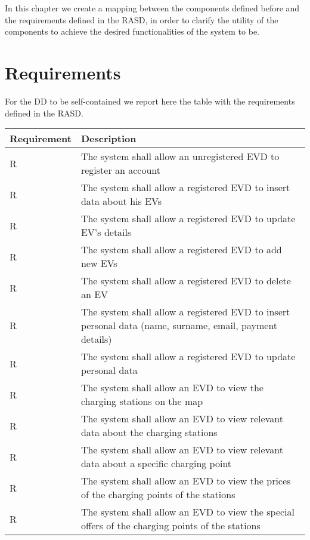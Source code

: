 In this chapter we create a mapping between the components defined before and the requirements defined in the RASD, in order to clarify the utility of the components to achieve the desired functionalities of the system to be. 
\section{Requirements}
For the DD to be self-contained we report here the table with the requirements defined in the RASD.  
\setcounter{r}{1}
\newcommand{\rcount}{\ther\stepcounter{r}}
\begin{center}
    \begin{longtable}[H]{|p{0.2\linewidth}|p{0.8\linewidth}|}
     \hline
     \textbf{Requirement} & \textbf{Description}\\
     \hline
     R\rcount & The system shall allow an unregistered EVD to register an account\\
     \hline
     R\rcount & The system shall allow a registered EVD to insert data about his EVs \\
     \hline
     R\rcount & The system shall allow a registered EVD to update EV's details\\
     \hline
     R\rcount & The system shall allow a registered EVD to add new EVs \\
     \hline
     R\rcount & The system shall allow a registered EVD to delete an EV\\
     \hline
     R\rcount & The system shall allow a registered EVD to insert personal data (name, surname, email, payment details)\\
     \hline
     R\rcount & The system shall allow a registered EVD to update personal data\\
     \hline
     R\rcount & The system shall allow an EVD to view the charging stations on the map\\
     \hline
     R\rcount & The system shall allow an EVD to view relevant data about the charging stations\\
     \hline
     R\rcount & The system shall allow an EVD to view relevant data about a specific charging point\\
     \hline
     R\rcount & The system shall allow an EVD to view the prices of the charging points of the stations\\
     \hline
     R\rcount & The system shall allow an EVD to view the special offers of the charging points of the stations\\

\end{longtable}
\end{center}
